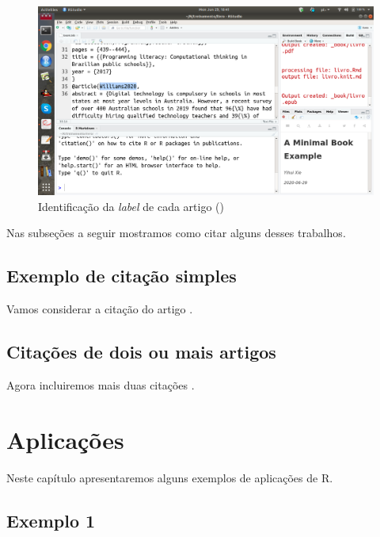 \documentclass[
]{book}
\begin{document}
\begin{figure}
\centering
\includegraphics{fig/rstudio_open_bookbib_third.png}
\caption{Identificação da \emph{label} de cada artigo (\citep{Williams2020})}
\end{figure}

Nas subseções a seguir mostramos como citar alguns desses trabalhos.

\hypertarget{exemplo-de-citauxe7uxe3o-simples}{%
\section{Exemplo de citação simples}\label{exemplo-de-citauxe7uxe3o-simples}}

Vamos considerar a citação do artigo \citep{Partanen2016}.

\hypertarget{citauxe7uxf5es-de-dois-ou-mais-artigos}{%
\section{Citações de dois ou mais artigos}\label{citauxe7uxf5es-de-dois-ou-mais-artigos}}

Agora incluiremos mais duas citações \citep[\citet{Williams2020}]{DaSilvaEloy2017}.

\hypertarget{aplicauxe7uxf5es}{%
\chapter{Aplicações}\label{aplicauxe7uxf5es}}

Neste capítulo apresentaremos alguns exemplos de
aplicações de R.

\hypertarget{exemplo-1}{%
\section{Exemplo 1}\label{exemplo-1}}
\end{document}
